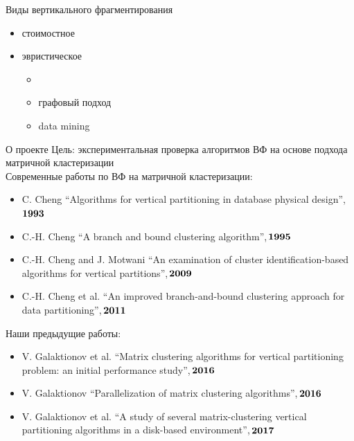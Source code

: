 \documentclass[10pt, dvipsnames]{beamer}
\begin{document}
\begin{frame}{Виды вертикального фрагментирования}	
	\begin{itemize}
	\item стоимостное\\[0.4cm] 
	\item эвристическое\\[0.2cm]
		\begin{itemize}
		\item \color{red}\uline{\color{black}{методы матричной кластеризации}}\color{black}\\[0.1cm]
		\item графовый подход\\[0.1cm]
		\item data mining 
		\end{itemize}
	\end{itemize}
\end{frame}

\begin{frame}{О проекте}
Цель: экспериментальная проверка алгоритмов ВФ на основе подхода матричной кластеризации\\[0.1cm]
Современные работы по ВФ на матричной кластеризации:	
	\begin{itemize}
	\item C. Cheng “Algorithms for vertical partitioning in database physical design”,\,$\bold{1993}$
	\item C.-H. Cheng “A branch and bound clustering algorithm”,\,$\bold{1995}$
	\item C.-H. Cheng and J. Motwani “An examination of cluster
identification-based algorithms for vertical partitions”,\,$\bold{2009}$
	\item C.-H. Cheng et al. “An improved branch-and-bound clustering approach for data partitioning”,\,$\bold{2011}$
	\end{itemize}

Наши предыдущие работы:
	\begin{itemize}
	\item V. Galaktionov et al. “Matrix clustering algorithms for vertical partitioning problem: an initial performance study”,\,$\bold{2016}$
	\item V. Galaktionov “Parallelization of matrix clustering algorithms”,\,$\bold{2016}$
	\item V. Galaktionov et al. “A study of several matrix-clustering vertical partitioning algorithms in a disk-based environment”,\,$\bold{2017}$
	\end{itemize}
\end{frame}
\end{document}
